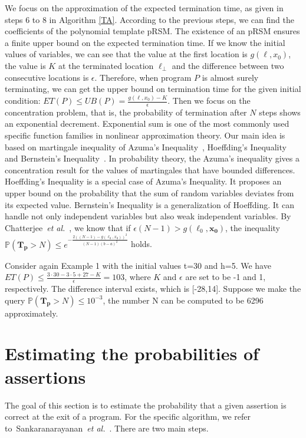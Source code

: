 \documentclass[runningheads]{llncs}
\begin{document}
We focus on the approximation of the expected termination time, as given in steps 6 to 8 in Algorithm \ref{TA}. According to the previous steps, we can find the coefficients of the polynomial template pRSM. The existence of an pRSM ensures a finite upper bound on the expected termination time. If we know the initial values of variables, we can see that the value at the first location is $g(\ell, x_0)$, the value is $K$ at the terminated location $\ell_\bot$ and the difference between two consecutive locations is $\epsilon$.  Therefore, when program $P$ is almost surely terminating, we can get the upper bound on termination time for the given initial condition: $ET(P) \leq UB(P) = \frac{g(\ell, x_0)-K}{\epsilon}$. 
Then we focus on the concentration problem, that is, the probability of termination after $N$ steps shows an exponential decrement. Exponential sum is one of the most commonly used specific function families in nonlinear approximation theory. Our main idea is based on martingale inequality of Azuma's Inequality~\cite{Azuma1967}, Hoeffding's Inequality~\cite{Hoeffding1963,McDiarmid1998Concentration}  and Bernstein's Inequality~\cite{Bennett1962,McDiarmid1998Concentration}. In probability theory, the Azuma's inequality gives a concentration result for the values of martingales that have bounded differences. Hoeffding's Inequality is a special case of Azuma's Inequality. It proposes an upper bound on the probability that the sum of random variables deviates from its expected value. Bernstein's Inequality is a generalization of Hoeffding. It can handle not only independent variables but also weak independent variables. By Chatterjee~\emph{et al.}~\cite{cha2015algorithmic}, we know that if $\epsilon(N-1) > g(\ell_0,\boldsymbol{x_0})$, the inequality $\mathbb{P}(\bm{T_p} > N)\leq e^{-\frac{2((N-1)-g(\ell_0,x_0))^2}{(N-1)(b-a)^2}}$ holds. 

Consider again Example 1 with the initial values t=30 and h=5. We have  $ET(P) \leq \frac{3\cdot 30-3\cdot 5+27-K}{\epsilon}=103$, where $K$ and $\epsilon$ are set to be -1 and 1, respectively. The difference interval exists, which is [-28,14]. Suppose we make the query $\mathbb{P}(\bm{T_p} > N)\leq 10^{-3}$, the number N can be computed to be 6296  approximately.

\section{Estimating the probabilities of assertions}
The goal of this section is to estimate the probability that a given assertion is correct at the exit of a program. For the specific algorithm, we refer to~Sankaranarayanan~\emph{et al.}~\cite{Sankaranarayanan2013Static}. There are two main steps.
\end{document}
